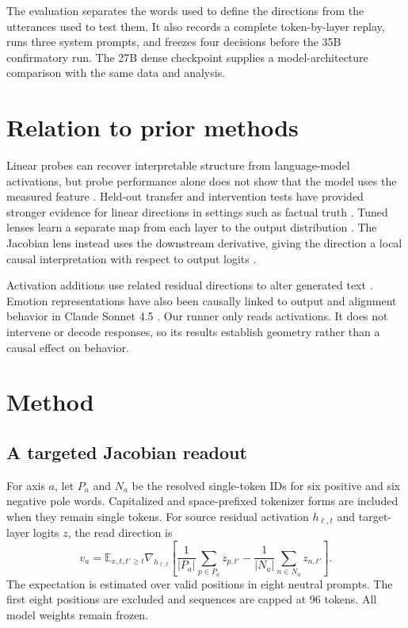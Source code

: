 \documentclass[10pt]{article}
\begin{document}
The evaluation separates the words used to define the directions from the
utterances used to test them. It also records a complete token-by-layer replay,
runs three system prompts, and freezes four decisions before the 35B
confirmatory run. The 27B dense checkpoint supplies a model-architecture
comparison with the same data and analysis.

\section{Relation to prior methods}

Linear probes can recover interpretable structure from language-model
activations, but probe performance alone does not show that the model uses the
measured feature \cite{hewitt2019probes}. Held-out transfer and intervention
tests have provided stronger evidence for linear directions in settings such
as factual truth \cite{marks2024truth}. Tuned lenses learn a separate map from
each layer to the output distribution \cite{belrose2023tuned}. The Jacobian
lens instead uses the downstream derivative, giving the direction a local
causal interpretation with respect to output logits
\cite{gurnee2026verbalizable}.

Activation additions use related residual directions to alter generated text
\cite{subramani2022steering,turner2024activation}. Emotion representations have
also been causally linked to output and alignment behavior in Claude Sonnet
4.5 \cite{sofroniew2026emotion}. Our runner only reads activations. It does not
intervene or decode responses, so its results establish geometry rather than a
causal effect on behavior.

\section{Method}

\subsection{A targeted Jacobian readout}

For axis $a$, let $P_a$ and $N_a$ be the resolved single-token IDs for six
positive and six negative pole words. Capitalized and space-prefixed tokenizer
forms are included when they remain single tokens. For source residual
activation $h_{\ell,t}$ and target-layer logits $z$, the read direction is
\begin{equation}
  v_a =
  \mathbb{E}_{x,t,t'\geq t}
  \nabla_{h_{\ell,t}}
  \left[
    \frac{1}{|P_a|}\sum_{p\in P_a} z_{p,t'}
    -
    \frac{1}{|N_a|}\sum_{n\in N_a} z_{n,t'}
  \right].
\end{equation}
The expectation is estimated over valid positions in eight neutral prompts.
The first eight positions are excluded and sequences are capped at 96 tokens.
All model weights remain frozen.
\end{document}
